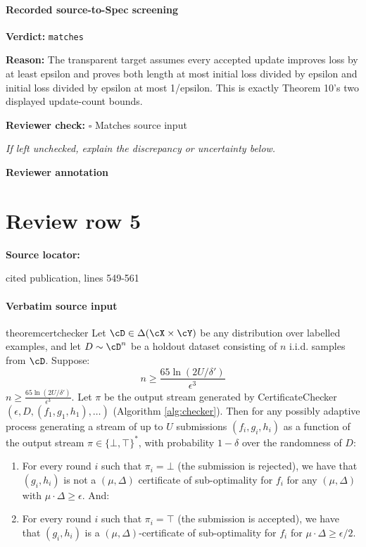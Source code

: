 \documentclass[10pt]{article}
\newcommand{\reviewerbox}{%
  \par\noindent\fbox{\parbox{0.96\linewidth}{\rule{0pt}{0.38in}}}\par
}
\newcommand{\reviewmatch}[1]{%
  \par\noindent\textbf{Reviewer check:} $\square$\; #1\par
  \noindent\emph{If left unchecked, explain the discrepancy or uncertainty below.}\par
}
\begin{document}
\paragraph{Recorded source-to-Spec screening}
\textbf{Verdict:} \texttt{matches}
\\
{\raggedright
\textbf{Reason:} The transparent target assumes every accepted update improves loss by at least epsilon and proves both length at most initial loss divided by epsilon and initial loss divided by epsilon at most 1/\allowbreak{}epsilon.\allowbreak{} This is exactly Theorem 10's two displayed update-\allowbreak{}count bounds.\allowbreak{}
\par}
\reviewmatch{Matches source input}
\noindent\textbf{Reviewer annotation}\par
\reviewerbox
\clearpage
\hypertarget{source-claim-b381dd2675ca5a7d}{}
\section*{Review row 5}
\textbf{Source locator:} {\footnotesize\raggedright cited publication, lines 549-\allowbreak{}561\par}
\paragraph{Verbatim source input}
\begin{ReviewVerbatim}
\begin{restatable}{theorem}{certchecker}
\label{thm:adaptive}
Let $\cD \in \Delta(\cX \times \cY)$ be any distribution over labelled examples, and let $D \sim \cD^n$ be a holdout dataset consisting of $n$ i.i.d. samples from $\cD$. Suppose:
\ifdraft
$$n \geq \frac{65 \ln(2U/\delta')}{\epsilon^3}$$
\else $n \geq \frac{65 \ln(2U/\delta')}{\epsilon^3}$. \fi
Let $\pi$ be the output stream generated by CertificateChecker$(\epsilon,D,(f_1,g_1,h_1),\ldots)$ (Algorithm \ref{alg:checker}).
Then for any possibly adaptive process generating a stream of up to $U$ submissions $(f_i,g_i,h_i)$ as a function of the output stream $\pi \in \{\bot,\top\}^*$, with probability $1-\delta$ over the randomness of $D$:
\begin{enumerate}
    \item For every round $i$ such that $\pi_i = \bot$ (the submission is rejected), we have that $(g_i,h_i)$ is not a $(\mu,\Delta)$ certificate of sub-optimality for $f_i$ for any $(\mu,\Delta)$ with $\mu\cdot \Delta \geq \epsilon$. And:
    \item For every round $i$ such that $\pi_i = \top$ (the submission is accepted), we have that $(g_i,h_i)$ is a $(\mu,\Delta)$-certificate of sub-optimality for $f_i$ for $\mu\cdot\Delta \geq \epsilon/2$.
\end{enumerate}
\end{restatable}
\end{ReviewVerbatim}
\end{document}
